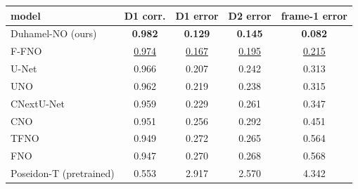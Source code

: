 \begin{tabular}{lcccc}
\toprule
model & D1 corr. & D1 error & D2 error & frame-1 error \\
\midrule
Duhamel-NO (ours) & \textbf{0.982} & \textbf{0.129} & \textbf{0.145} & \textbf{0.082} \\
\midrule
F-FNO & \underline{0.974} & \underline{0.167} & \underline{0.195} & \underline{0.215} \\
U-Net & 0.966 & 0.207 & 0.242 & 0.313 \\
UNO & 0.962 & 0.219 & 0.238 & 0.315 \\
CNextU-Net & 0.959 & 0.229 & 0.261 & 0.347 \\
CNO & 0.951 & 0.256 & 0.292 & 0.451 \\
TFNO & 0.949 & 0.272 & 0.265 & 0.564 \\
FNO & 0.947 & 0.270 & 0.268 & 0.568 \\
Poseidon-T (pretrained) & 0.553 & 2.917 & 2.570 & 4.342 \\
\bottomrule
\end{tabular}